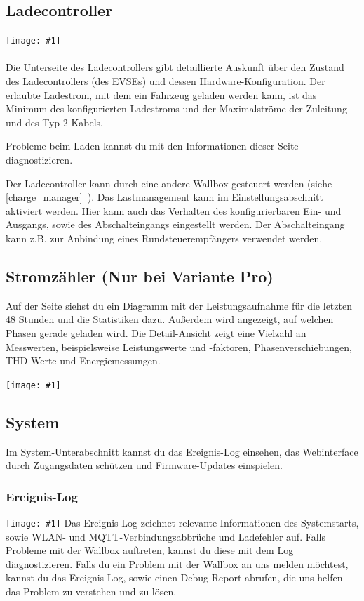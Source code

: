 \documentclass[a4paper,10pt]{article}
\newcommand{\gfx}[1]{\texttt{[image: \#1]}}
\newcommand*{\fullref}[1]{\hyperref[{#1}]{\ref*{#1}~\nameref*{#1}}}
\begin{document}
\begin{multicols*}{2}
	\subsection{Ladecontroller}
	\gfx{./img_warp2/resized/web_evse2}
	\\\\
	Die Unterseite des Ladecontrollers gibt detaillierte Auskunft über den Zustand
	des Ladecontrollers (des EVSEs) und dessen Hardware-Konfiguration. Der
	erlaubte Ladestrom, mit dem ein Fahrzeug geladen werden kann, ist das Minimum des
	konfigurierten Ladestroms und der Maximalströme der Zuleitung und des Typ-2-Kabels.

	Probleme beim Laden kannst du mit den Informationen dieser
	Seite diagnostizieren.

	Der Ladecontroller kann durch eine andere Wallbox gesteuert werden (siehe \fullref{charge_manager}).
	Das Lastmanagement kann im Einstellungsabschnitt aktiviert werden. Hier kann auch das Verhalten des
	konfigurierbaren Ein- und Ausgangs, sowie des Abschalteingangs eingestellt werden. Der Abschalteingang
	kann z.B. zur Anbindung eines Rundsteuerempfängers verwendet werden.

	\subsection{Stromzähler (Nur bei Variante Pro)}
	Auf der Seite siehst du ein Diagramm mit der Leistungsaufnahme für die letzten 48 Stunden und die
	Statistiken dazu. Außerdem wird angezeigt, auf welchen Phasen gerade geladen wird.
	Die Detail-Ansicht zeigt eine Vielzahl an Messwerten, beispielsweise Leistungswerte und -faktoren,
	Phasenverschiebungen, THD-Werte und Energiemessungen.

	\gfx{./img_warp2/resized/web_meter}

	\subsection{System}
	Im System-Unterabschnitt kannst du das Ereignis-Log einsehen, das Webinterface durch Zugangsdaten schützen und Firmware-Updates einspielen.
	\subsubsection{Ereignis-Log}
	\gfx{./img_warp2/resized/web_event_log}
	Das Ereignis-Log zeichnet relevante Informationen des Systemstarts, sowie WLAN- und MQTT-Verbindungsabbrüche und Ladefehler auf.
	Falls Probleme mit der Wallbox auftreten, kannst du diese mit dem Log diagnostizieren.
	Falls du ein Problem mit der Wallbox an uns melden möchtest, kannst du das Ereignis-Log,
	sowie einen Debug-Report abrufen, die uns helfen das Problem zu verstehen und zu lösen.


\end{multicols*}
\end{document}

